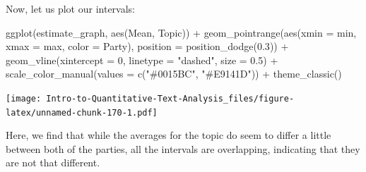 \documentclass[
]{article}
\newenvironment{Shaded}{\begin{snugshade}}{\end{snugshade}}
\newcommand{\AttributeTok}[1]{\textcolor[rgb]{0.77,0.63,0.00}{#1}}
\newcommand{\DecValTok}[1]{\textcolor[rgb]{0.00,0.00,0.81}{#1}}
\newcommand{\FloatTok}[1]{\textcolor[rgb]{0.00,0.00,0.81}{#1}}
\newcommand{\FunctionTok}[1]{\textcolor[rgb]{0.00,0.00,0.00}{#1}}
\newcommand{\NormalTok}[1]{#1}
\newcommand{\OtherTok}[1]{\textcolor[rgb]{0.56,0.35,0.01}{#1}}
\newcommand{\SpecialCharTok}[1]{\textcolor[rgb]{0.00,0.00,0.00}{#1}}
\newcommand{\StringTok}[1]{\textcolor[rgb]{0.31,0.60,0.02}{#1}}
\begin{document}
\begin{Shaded}
\end{Shaded}

Now, let us plot our intervals:

\begin{Shaded}
\begin{Highlighting}[]
\FunctionTok{ggplot}\NormalTok{(estimate\_graph, }\FunctionTok{aes}\NormalTok{(Mean, Topic)) }\SpecialCharTok{+} \FunctionTok{geom\_pointrange}\NormalTok{(}\FunctionTok{aes}\NormalTok{(}\AttributeTok{xmin =}\NormalTok{ min,}
    \AttributeTok{xmax =}\NormalTok{ max, }\AttributeTok{color =}\NormalTok{ Party), }\AttributeTok{position =} \FunctionTok{position\_dodge}\NormalTok{(}\FloatTok{0.3}\NormalTok{)) }\SpecialCharTok{+}
    \FunctionTok{geom\_vline}\NormalTok{(}\AttributeTok{xintercept =} \DecValTok{0}\NormalTok{, }\AttributeTok{linetype =} \StringTok{"dashed"}\NormalTok{, }\AttributeTok{size =} \FloatTok{0.5}\NormalTok{) }\SpecialCharTok{+}
    \FunctionTok{scale\_color\_manual}\NormalTok{(}\AttributeTok{values =} \FunctionTok{c}\NormalTok{(}\StringTok{"\#0015BC"}\NormalTok{, }\StringTok{"\#E9141D"}\NormalTok{)) }\SpecialCharTok{+} \FunctionTok{theme\_classic}\NormalTok{()}
\end{Highlighting}
\end{Shaded}

\texttt{[image: Intro-to-Quantitative-Text-Analysis\_files/figure-latex/unnamed-chunk-170-1.pdf]}

Here, we find that while the averages for the topic do seem to differ a little between both of the parties, all the intervals are overlapping, indicating that they are not that different.

\printbibliography
\end{document}
